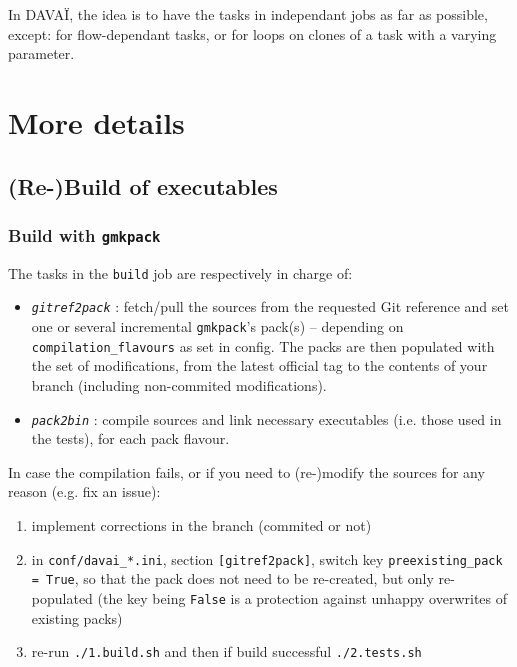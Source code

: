 \documentclass[a4paper,10pt,twoside]{article}
\begin{document}
In DAVAÏ, the idea is to have the tasks in independant jobs as far as possible, except: for flow-dependant tasks, or for loops on clones of a task with a varying parameter.








\newpage
\section{More details\label{sect:options}}

\subsection{(Re-)Build of executables}
\subsubsection{Build with \texttt{gmkpack}}
The tasks in the \texttt{build} job are respectively in charge of:
\begin{itemize}
 \item \texttt{\textit{gitref2pack}} : fetch/pull the sources from the requested Git reference and set one or several incremental \texttt{gmkpack}'s pack(s) -- depending on \texttt{compilation\_flavours} as set in config. The packs are then populated with the set of modifications, from the latest official tag to the contents of your branch (including non-commited modifications).
 \item \texttt{\textit{pack2bin}} : compile sources and link necessary executables (i.e. those used in the tests), for each pack flavour.
\end{itemize}

\noindent In case the compilation fails, or if you need to (re-)modify the sources for any reason (e.g. fix an issue):
\begin{enumerate}[label=\arabic*.]
  \item implement corrections in the branch (commited or not)
  \item in \texttt{conf/davai\_*.ini}, section \texttt{[gitref2pack]}, switch key \texttt{preexisting\_pack = True}, so that the pack does not need to be re-created, but only re-populated (the key being \texttt{False} is a protection against unhappy overwrites of existing packs)
  \item re-run \texttt{./1.build.sh} and then if build successful \texttt{./2.tests.sh}
 \end{enumerate}
\end{document}
